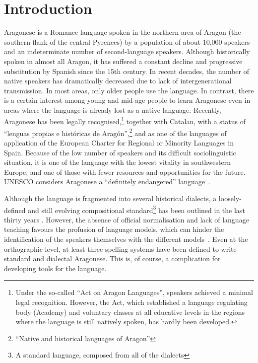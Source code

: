 \documentclass[10pt,a4paper,twocolumn]{article}
\begin{document}
  \section{Introduction}
  Aragonese is a Romance language spoken in the northern area of Aragon (the southern flank of the central Pyrenees) by a population of about 10,000 speakers and an indeterminate number of second-language speakers. 
  Although historically spoken in almost all Aragon, it has suffered a constant decline and progressive substitution by Spanish since the 15th century. 
  In recent decades, the number of native speakers has dramatically decreased due to lack of intergenerational transmission. 
  In most areas, only older people use the language. 
  In contrast, there is a certain interest among young and mid-age people to learn Aragonese even in areas where the language is already lost as a native language. Recently, Aragonese has been legally recognised,\footnote{Under the so-called ``Act on Aragon Languages'', speakers achieved a minimal legal recognition. However, the Act, which established a language regulating body (Academy) and voluntary classes at all educative levels in the regions where the language is still natively spoken, has hardly been developed.} together with Catalan, with a status of ``lenguas propias e históricas de Aragón'',\footnote{``Native and historical languages of Aragon''} and as one of the languages of application of the European Charter for Regional or Minority Languages in Spain. 
  Because of the low number of speakers and its difficult sociolinguistic situation, it is one of the language with the lowest vitality in southwestern Europe, and one of those with fewer resources and opportunities for the future. 
  UNESCO considers Aragonese a ``definitely endangered'' language~\cite{UNESCO}.

  Although the language is fragmented into several historical dialects, a loosely-defined and still evolving compositional standard\footnote{A standard language, composed from all of the dialects} has been outlined in the last thirty years \cite{Berceo,Metzeltin,EFA}. However, the absence of official normalisation and lack of language teaching favours the profusion of language models, which can hinder the identification of the speakers themselves with the different models~\cite{Paricio}. Even at the orthographic level, at least three spelling systems have been defined to write standard and dialectal Aragonese. This is, of course, a complication for developing tools for the language. 
\end{document}
